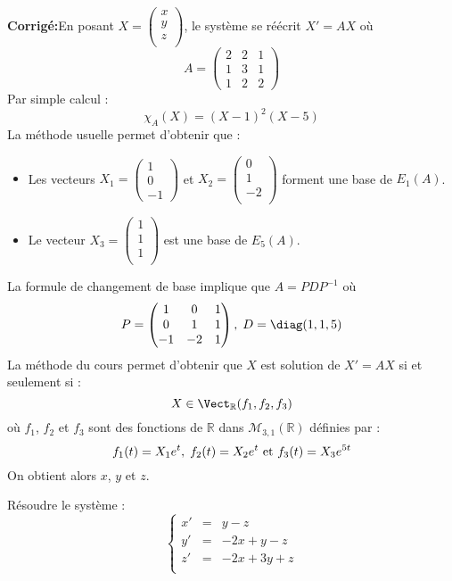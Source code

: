 \documentclass[a4paper,twoside,french,11pt]{VcCours}
\newcommand{\corr}{\textbf{Corrigé:}}
\begin{document}
\corr En posant $X = \begin{pmatrix}
x \\
y \\
z \\
\end{pmatrix}$, le système se réécrit $X'=AX$ où 
$$A= \left(\begin{array}{rrr}  2 & 2 & 1\\
1 & 3 & 1\\
1 & 2 & 2 \end{array}\right)$$
Par simple calcul :
$$ \chi_A(X)= (X-1)^2 (X-5)$$
La méthode usuelle permet d'obtenir que :
\begin{itemize}
\item Les vecteurs $X_1=\begin{pmatrix}
1 \\
0 \\
-1
\end{pmatrix}$ et $X_2=\begin{pmatrix}
0\\
1 \\
-2 \\
\end{pmatrix}$ forment une base de $E_1(A)$.
\item Le vecteur $X_3=\begin{pmatrix}
1 \\
1 \\
1 \\
\end{pmatrix}$ est une base de $E_5(A)$.
\end{itemize}
La formule de changement de base implique que $A=PDP^{-1}$ où 
$$ P = \begin{pmatrix}
1& 0 & 1 \\
0& 1 & 1 \\
-1 & -2 & 1 \\
\end{pmatrix}, \; D= \diag(1,1,5)$$
La méthode du cours permet d'obtenir que $X$ est solution de $X'=AX$ si et seulement si :
$$X \in \Vect_{\mathbb{R}} (f_1,f_2,f_3)$$
où $f_1$, $f_2$ et $f_3$ sont des fonctions de $\mathbb{R}$ dans $\mathcal{M}_{3,1}(\mathbb{R})$ définies par :
$$ f_1(t)= X_1 e^{t}, \; f_2(t) = X_2 e^{t} \hbox{ et } f_3(t) =X_3 e^{5t} $$
On obtient alors $x$, $y$ et $z$.


\begin{Exercice}{} Résoudre le système :
$$ \left\lbrace \begin{array}{ccl}
x' & = & y-z \\
y' & = &-2x+y-z \\
z' & =& -2x+3y+z \\
\end{array}\right.$$
\end{Exercice}
\end{document}
